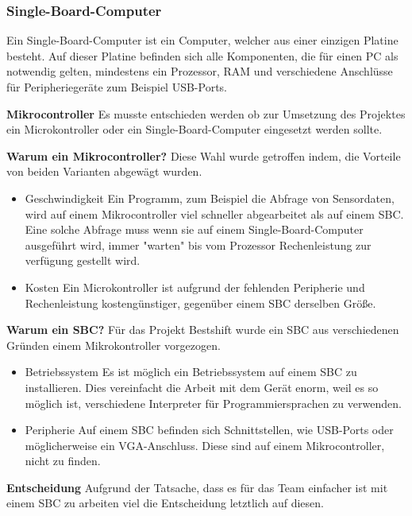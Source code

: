\subsubsection{Single-Board-Computer}
\label{subsec:Single-Board-Computer}
Ein Single-Board-Computer ist ein Computer, welcher aus einer einzigen Platine besteht. Auf dieser Platine befinden sich alle Komponenten, die für einen PC als notwendig gelten, mindestens ein Prozessor, RAM und verschiedene Anschlüsse für Peripheriegeräte zum Beispiel USB-Ports. \newline


\textbf{Mikrocontroller \nextline}
Es musste entschieden werden ob zur Umsetzung des Projektes ein Microkontroller oder ein Single-Board-Computer eingesetzt werden sollte. \newline

\textbf{Warum ein Mikrocontroller? \nextline}
Diese Wahl wurde getroffen indem, die Vorteile von beiden Varianten abgewägt wurden.
\begin{itemize}
\item Geschwindigkeit \newline
Ein Programm, zum Beispiel die Abfrage von Sensordaten, wird auf einem Mikrocontroller viel schneller abgearbeitet als auf einem SBC. Eine solche Abfrage muss wenn sie auf einem Single-Board-Computer ausgeführt wird, immer "warten" bis vom Prozessor Rechenleistung zur verfügung gestellt wird.

\item Kosten \newline
Ein Microkontroller ist aufgrund der fehlenden Peripherie und Rechenleistung kostengünstiger, gegenüber einem SBC derselben Größe.
\end{itemize}

\textbf{Warum ein SBC? \nextline}
Für das Projekt Bestshift wurde ein SBC aus verschiedenen Gründen einem Mikrokontroller vorgezogen.
\begin{itemize}
\item Betriebssystem \newline
Es ist möglich ein Betriebssystem auf einem SBC zu installieren. Dies vereinfacht die Arbeit mit dem Gerät enorm, weil es so möglich ist, verschiedene Interpreter für Programmiersprachen zu verwenden. \newline
\item Peripherie \newline
Auf einem SBC befinden sich Schnittstellen, wie USB-Ports oder möglicherweise ein VGA-Anschluss. Diese sind auf einem Mikrocontroller, nicht zu finden.
\end{itemize}

\textbf{Entscheidung \nextline}
Aufgrund der Tatsache, dass es für das Team einfacher ist mit einem SBC zu arbeiten viel die Entscheidung letztlich auf diesen.